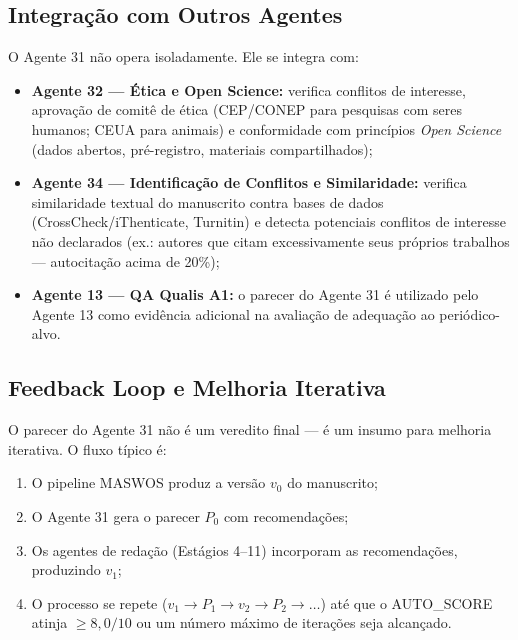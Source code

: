 \subsection{Integração com Outros Agentes}
\label{sec:peerreview_integracao}

O Agente 31 não opera isoladamente. Ele se integra com:

\begin{itemize}
    \item \textbf{Agente 32 — Ética e Open Science:} verifica
    conflitos de interesse, aprovação de comitê de ética (CEP/CONEP
    para pesquisas com seres humanos; CEUA para animais) e
    conformidade com princípios \textit{Open Science} (dados
    abertos, pré-registro, materiais compartilhados);

    \item \textbf{Agente 34 — Identificação de Conflitos e
    Similaridade:} verifica similaridade textual do manuscrito
    contra bases de dados (CrossCheck/iThenticate, Turnitin) e
    detecta potenciais conflitos de interesse não declarados
    (ex.: autores que citam excessivamente seus próprios
    trabalhos — autocitação acima de 20\%);

    \item \textbf{Agente 13 — QA Qualis A1:} o parecer do Agente 31
    é utilizado pelo Agente 13 como evidência adicional na
    avaliação de adequação ao periódico-alvo.
\end{itemize}

\subsection{Feedback Loop e Melhoria Iterativa}
\label{sec:feedback_loop}

O parecer do Agente 31 não é um veredito final — é um insumo para
melhoria iterativa. O fluxo típico é:

\begin{enumerate}
    \item O pipeline MASWOS produz a versão $v_0$ do manuscrito;

    \item O Agente 31 gera o parecer $P_0$ com recomendações;

    \item Os agentes de redação (Estágios 4--11) incorporam as
    recomendações, produzindo $v_1$;

    \item O processo se repete ($v_1 \to P_1 \to v_2 \to P_2 \to
    \dots$) até que o AUTO\_SCORE atinja $\geq 8,0/10$ ou um número
    máximo de iterações seja alcançado.
\end{enumerate}

